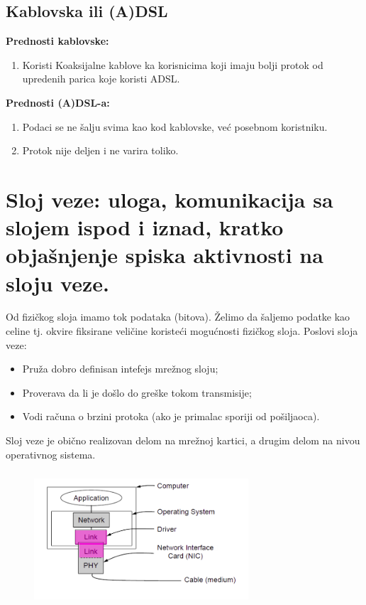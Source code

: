 \documentclass[a4paper]{article}
\begin{document}
    \subsection{Kablovska ili (A)DSL}
        \noindent \textbf{Prednosti kablovske:}
        \begin{enumerate}
            \item Koristi Koaksijalne kablove ka korisnicima koji imaju bolji protok od 
                  upredenih parica koje koristi ADSL.
        \end{enumerate}
        \textbf{Prednosti (A)DSL-a:}
        \begin{enumerate}
            \item Podaci se ne šalju svima kao kod kablovske, već posebnom koristniku.
            \item Protok nije deljen i ne varira toliko.
        \end{enumerate}
    

\section{Sloj veze: uloga, komunikacija sa slojem ispod i iznad, kratko objašnjenje spiska aktivnosti
na sloju veze. }
    Od fizičkog sloja imamo tok podataka (bitova). Želimo da šaljemo podatke kao celine tj. okvire
    fiksirane veličine koristeći mogućnosti fizičkog sloja. Poslovi sloja veze:
    \begin{itemize}
        \item Pruža dobro definisan intefejs mrežnog sloju;
        \item Proverava da li je došlo do greške tokom transmisije;
        \item Vodi računa o brzini protoka (ako je primalac sporiji od pošiljaoca).
    \end{itemize}

    Sloj veze je obično realizovan delom na mrežnoj kartici, a drugim delom na nivou
    operativnog sistema.
    \begin{figure}[H]
        \begin{center}
            \includegraphics[width=80mm,height=50mm]{Slike/slojevi_softver_hardver.png}
        \end{center}
    \end{figure}
\end{document}
